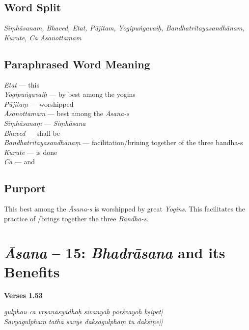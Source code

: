 \subsection*{Word Split}
\vspace{-5pt}

\textit{Siṃhāsanam,  Bhaved, Etat, Pūjitam, Yogipuṅgavaiḥ, Bandhatritayasandhānam, Kurute, Ca Āsanottamam}
\vspace{-5pt}
\subsection*{Paraphrased Word Meaning}
\vspace{-5pt}	
\begin{multicols}{2}
\textit{Etat} ---  this \\
\textit{Yogipuṅgavaiḥ} --- by best among the yogins   \\
\textit{Pūjitaṃ} ---  worshipped  \\
\textit{Āsanottamam} --- best among the \textit{Āsana-s} \\
\textit{Siṃhāsanaṃ} ---  \textit{Siṃhāsana} \\
\textit{Bhaved} ---   shall be   \\
\textit{Bandhatritayasandhānaṃ} --- facilitation/brining together of the three bandha-s   \\
\textit{Kurute} ---  is done  \\
\textit{Ca} --- and
\end{multicols}

\subsection*{Purport}

This best among the \textit{Āsana-s} is worshipped by great \textit{Yogins}. This facilitates the practice of /brings together the three \textit{Bandha-s}.


\section*{\textit{Āsana} -- 15: \textit{Bhadrāsana} and its Benefits}

\noindent \textbf{Verses 1.53}

\begin{shloka}
\textit{gulphau ca vṛṣaṇāsyādhaḥ sīvanyāḥ pārśvayoḥ kṣipet|}\\
\textit{Savyagulphaṃ tathā savye dakṣagulphaṃ tu dakṣiṇe||}
\end{shloka}

